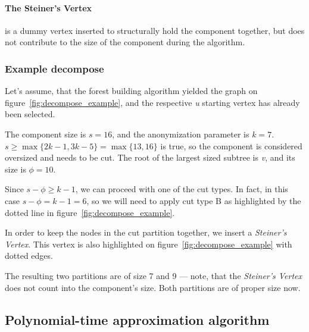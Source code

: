 \vspace{\baselineskip}


\paragraph{The Steiner's Vertex} is a dummy vertex inserted to structurally hold the component together, but does not contribute to the size of the component during the algorithm.

\vspace{\baselineskip}


\subsubsection{Example decompose}

Let's assume, that the forest building algorithm yielded the graph on figure~\ref{fig:decompose_example}, and the respective \textit{u} starting vertex has already been selected.

\vspace{\baselineskip}


The component size is \(s=16\), and the anonymization parameter is \(k=7\). \(s \ge \max \{ 2k-1,3k-5\} = \max \{ 13, 16 \} \) is true, so the component is considered oversized and needs to be cut.
The root of the largest sized subtree is \textit{v}, and its size is \(\phi=10\).

Since \(s-\phi \ge k-1\), we can proceed with one of the cut types.
In fact, in this case \(s-\phi=k-1=6\), so we will need to apply cut type B as highlighted by the dotted line in figure~\ref{fig:decompose_example}.

In order to keep the nodes in the cut partition together, we insert a \emph{Steiner's Vertex}.
This vertex is also highlighted on figure~\ref{fig:decompose_example} with dotted edges.

The resulting two partitions are of size 7 and 9 --- note, that the \emph{Steiner's Vertex} does not count into the component's size.
Both partitions are of proper size now.

\subsection{Polynomial-time approximation algorithm}\label{subsec:polynomial-time-approximation-algorithm}

